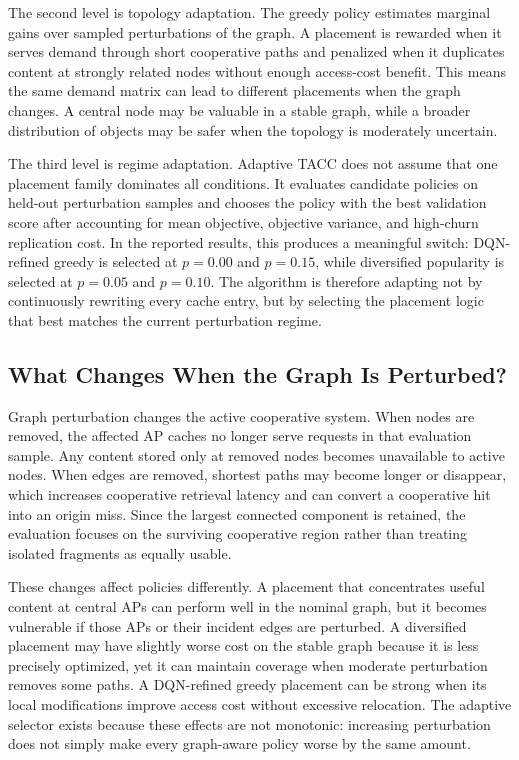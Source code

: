 The second level is topology adaptation. The greedy policy estimates marginal gains over sampled perturbations of the graph. A placement is rewarded when it serves demand through short cooperative paths and penalized when it duplicates content at strongly related nodes without enough access-cost benefit. This means the same demand matrix can lead to different placements when the graph changes. A central node may be valuable in a stable graph, while a broader distribution of objects may be safer when the topology is moderately uncertain.

The third level is regime adaptation. Adaptive TACC does not assume that one placement family dominates all conditions. It evaluates candidate policies on held-out perturbation samples and chooses the policy with the best validation score after accounting for mean objective, objective variance, and high-churn replication cost. In the reported results, this produces a meaningful switch: DQN-refined greedy is selected at \(p=0.00\) and \(p=0.15\), while diversified popularity is selected at \(p=0.05\) and \(p=0.10\). The algorithm is therefore adapting not by continuously rewriting every cache entry, but by selecting the placement logic that best matches the current perturbation regime.

\subsection{What Changes When the Graph Is Perturbed?}

Graph perturbation changes the active cooperative system. When nodes are removed, the affected AP caches no longer serve requests in that evaluation sample. Any content stored only at removed nodes becomes unavailable to active nodes. When edges are removed, shortest paths may become longer or disappear, which increases cooperative retrieval latency and can convert a cooperative hit into an origin miss. Since the largest connected component is retained, the evaluation focuses on the surviving cooperative region rather than treating isolated fragments as equally usable.

These changes affect policies differently. A placement that concentrates useful content at central APs can perform well in the nominal graph, but it becomes vulnerable if those APs or their incident edges are perturbed. A diversified placement may have slightly worse cost on the stable graph because it is less precisely optimized, yet it can maintain coverage when moderate perturbation removes some paths. A DQN-refined greedy placement can be strong when its local modifications improve access cost without excessive relocation. The adaptive selector exists because these effects are not monotonic: increasing perturbation does not simply make every graph-aware policy worse by the same amount.

